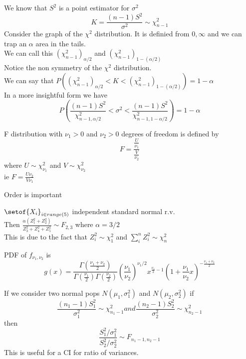 \documentclass[answers,12pt,addpoints]{exam}
\begin{document}
\begin{remark}
    We know that $S^2$ is a point estimator for $\sigma^2$ \\
    $$K = \frac{(n-1)S^2}{\sigma^2} \sim \chi^2_{n-1}$$
    Consider the graph of the $\chi^2$ distribution. It is definied from $0, \infty$ and we can trap an $\alpha$ area in the tails.\\
    We can call this $\left( \chi^2_{n-1} \right)_{\alpha/2}$ and $\left( \chi^2_{n-1} \right)_{1 - (\alpha/2)}$\\
    Notice the non symmetry of the $\chi^2$ distribution.\\
    We can say that $P\left( \left( \chi^2_{n-1} \right)_{\alpha/2} < K < \left( \chi^2_{n-1} \right)_{1 - (\alpha/2)} \right) = 1 - \alpha$\\
    In a more insightful form we have
    $$ P\left( \frac{(n-1) S^2}{\chi^2_{n-1, \alpha/2}} < \sigma^2 < \frac{(n-1) S^2}{\chi^2_{n-1, 1 - \alpha/2}}\right) = 1 - \alpha$$
\end{remark}
\begin{definition}[F distribution]
    F distribution with $\nu_1 > 0$ and $\nu_2 > 0$ degrees of freedom is defined by
    $$F = \frac{\frac{U}{\nu_1}}{\frac{V}{\nu_2}}$$
    where $U \sim \chi^2_{\nu_1}$ and $V \sim \chi^2_{\nu_2}$\\
    ie $F = \frac{U\nu_2}{V\nu_1}$
    \begin{remark}
        Order is important
    \end{remark}
\end{definition}
\begin{example}
    $\setof{X_i}_{i \in range(5)}$ independent standard normal r.v.\\
    Then $\frac{\alpha (Z_1^2 + Z_2^2)}{Z_3^2 + Z_4^2 + Z_5^2} \sim F_{2,3}$ where $\alpha = 3/2$\\
    This is due to the fact that $Z_i^2 \sim \chi^2_1$ and $\sum_i^n Z_i^2 \sim \chi^2_n$
\end{example}
\begin{theorem}
    PDF of $f_{\nu_1, \nu_2}$ is
    $$g(x) = \frac{\Gamma\left( \frac{\nu_1 + \nu_2}{2} \right)}{\Gamma\left( \frac{\nu_1}{2} \right) \Gamma\left( \frac{\nu_2}{2} \right)} \left( \frac{\nu_1}{\nu_2} \right)^{\nu_1/2} x^{\frac{\nu_1}{2} - 1} \left( 1 + \frac{\nu_1}{\nu_2} x \right)^{-\frac{\nu_1 + \nu_2}{2}}$$ 
\end{theorem}
If we consider two normal pops $N(\mu_1, \sigma_1^2)$ and $N(\mu_2, \sigma_2^2)$ if
$$ \frac{(n_1-1)S_1^2}{\sigma_1^2} \sim \chi^2_{n_1 - 1} and \frac{(n_2-1)S_2^2}{\sigma_2^2} \sim \chi^2_{n_2 - 1}$$
then
$$ \frac{S_1^2/\sigma_1^2}{S_2^2/\sigma_2^2} \sim F_{n_1 - 1, n_2 - 1}$$
This is useful for a CI for ratio of variances.\\
\end{document}
